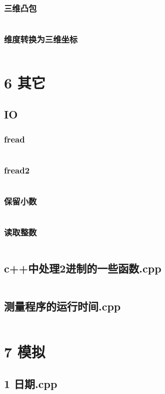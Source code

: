 \documentclass{article}
\begin{document}
\subsubsection{三维凸包}
\inputminted{c++}{/home/zzuzxy/t3/ACM-template/5 几何/3D/三维凸包.cpp}
\subsubsection{维度转换为三维坐标}
\inputminted{c++}{/home/zzuzxy/t3/ACM-template/5 几何/3D/维度转换为三维坐标.cpp}
\section{6 其它}
\subsection{IO}
\subsubsection{fread}
\inputminted{c++}{/home/zzuzxy/t3/ACM-template/6 其它/IO/fread.cpp}
\subsubsection{fread2}
\inputminted{c++}{/home/zzuzxy/t3/ACM-template/6 其它/IO/fread2.cpp}
\subsubsection{保留小数}
\inputminted{c++}{/home/zzuzxy/t3/ACM-template/6 其它/IO/保留小数.cpp}
\subsubsection{读取整数}
\inputminted{c++}{/home/zzuzxy/t3/ACM-template/6 其它/IO/读取整数.cpp}
\subsection{c++中处理2进制的一些函数.cpp}
\inputminted{c++}{/home/zzuzxy/t3/ACM-template/6 其它/c++中处理2进制的一些函数.cpp}
\subsection{测量程序的运行时间.cpp}
\inputminted{c++}{/home/zzuzxy/t3/ACM-template/6 其它/测量程序的运行时间.cpp}
\section{7 模拟}
\subsection{1 日期.cpp}
\inputminted{c++}{/home/zzuzxy/t3/ACM-template/7 模拟/1 日期.cpp}
\end{document}
